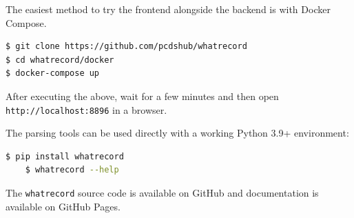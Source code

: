 \documentclass[letter,
               keeplastbox,   %
               ]{jacow}
\begin{document}
The easiest method to try the frontend alongside the backend is with Docker Compose.

\begin{lstlisting}[language=bash]
$ git clone https://github.com/pcdshub/whatrecord
$ cd whatrecord/docker
$ docker-compose up
\end{lstlisting}
After executing the above, wait for a few minutes and then open
\verb_http://localhost:8896_ in a browser.

The parsing tools can be used directly with a working Python 3.9+ environment:

\begin{lstlisting}[language=bash]
	$ pip install whatrecord
	$ whatrecord --help
\end{lstlisting}

The \verb_whatrecord_ source code is available on
GitHub\cite{whatrecord-github} and documentation is available on GitHub
Pages\cite{whatrecord-docs}.
\end{document}
